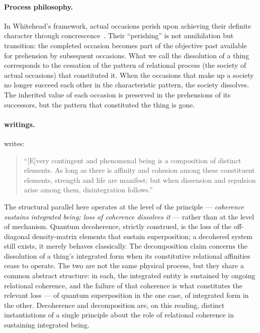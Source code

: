 \paragraph{Process philosophy.}
In Whitehead's framework, actual occasions perish upon achieving their
definite character through concrescence~\citep{Whitehead1929}.
Their ``perishing'' is not annihilation but transition: the completed
occasion becomes part of the objective past available for prehension
by subsequent occasions.
What we call the dissolution of a thing corresponds to the cessation
of the pattern of relational process (the society of actual occasions)
that constituted it.
When the occasions that make up a society no longer succeed each other
in the characteristic pattern, the society dissolves.
The inherited value of each occasion is preserved in the prehensions
of its successors, but the pattern that constituted the thing is gone.

\paragraph{\bahai writings.}
\AbdulBaha writes:
\begin{quote}
``[E]very contingent and phenomenal being is a composition of distinct
elements. As long as there is affinity and cohesion among these
constituent elements, strength and life are manifest; but when
dissension and repulsion arise among them, disintegration follows.''
\citep[Talk 41]{PUP}
\end{quote}
The structural parallel here operates at the level of the principle ---
\emph{coherence sustains integrated being; loss of coherence dissolves
it} --- rather than at the level of mechanism.
Quantum decoherence, strictly construed, is the loss of the off-diagonal
density-matrix elements that sustain superposition; a decohered system
still exists, it merely behaves classically.
The \bahai decomposition claim concerns the dissolution of a thing's
integrated form when its constitutive relational affinities cease to
operate.
The two are not the same physical process, but they share a common
abstract structure: in each, the integrated entity is sustained by
ongoing relational coherence, and the failure of that coherence is what
constitutes the relevant loss --- of quantum superposition in the one
case, of integrated form in the other.
Decoherence and decomposition are, on this reading, distinct
instantiations of a single principle about the role of relational
coherence in sustaining integrated being.

